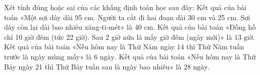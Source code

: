 \begin{ex} %
Xét tính đúng hoặc sai của các khẳng định toán học sau đây:
\choiceTF
{\True Kết quả của bài toán «Một sợi dây dài 95 cm. Người ta cắt đi hai đoạn dài 30 cm và 25 cm. Sợi dây còn lại dài bao nhiêu xăng-ti-mét» là $40\text{ cm}$.}
{Kết quả của bài toán «Đồng hồ chỉ 10 giờ đêm (tức 22 giờ). Sau 2 giờ nữa là mấy giờ đêm (ngày mới)» là $13\text{ giờ}$.}
{Kết quả của bài toán «Nếu hôm nay là Thứ Năm ngày 14 thì Thứ Năm tuần trước là ngày mùng mấy» là $6\text{ ngày}$.}
{\True Kết quả của bài toán «Nếu hôm nay là Thứ Bảy ngày 21 thì Thứ Bảy tuần sau là ngày bao nhiêu» là $28\text{ ngày}$.}
\end{ex}

